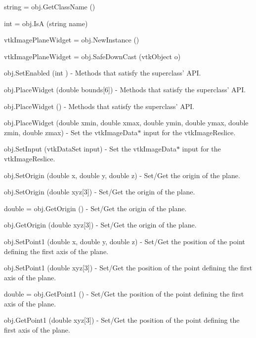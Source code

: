 \begin{DoxyItemize}
\item {\ttfamily string = obj.\-Get\-Class\-Name ()}  
\item {\ttfamily int = obj.\-Is\-A (string name)}  
\item {\ttfamily vtk\-Image\-Plane\-Widget = obj.\-New\-Instance ()}  
\item {\ttfamily vtk\-Image\-Plane\-Widget = obj.\-Safe\-Down\-Cast (vtk\-Object o)}  
\item {\ttfamily obj.\-Set\-Enabled (int )} -\/ Methods that satisfy the superclass' A\-P\-I.  
\item {\ttfamily obj.\-Place\-Widget (double bounds\mbox{[}6\mbox{]})} -\/ Methods that satisfy the superclass' A\-P\-I.  
\item {\ttfamily obj.\-Place\-Widget ()} -\/ Methods that satisfy the superclass' A\-P\-I.  
\item {\ttfamily obj.\-Place\-Widget (double xmin, double xmax, double ymin, double ymax, double zmin, double zmax)} -\/ Set the vtk\-Image\-Data$\ast$ input for the vtk\-Image\-Reslice.  
\item {\ttfamily obj.\-Set\-Input (vtk\-Data\-Set input)} -\/ Set the vtk\-Image\-Data$\ast$ input for the vtk\-Image\-Reslice.  
\item {\ttfamily obj.\-Set\-Origin (double x, double y, double z)} -\/ Set/\-Get the origin of the plane.  
\item {\ttfamily obj.\-Set\-Origin (double xyz\mbox{[}3\mbox{]})} -\/ Set/\-Get the origin of the plane.  
\item {\ttfamily double = obj.\-Get\-Origin ()} -\/ Set/\-Get the origin of the plane.  
\item {\ttfamily obj.\-Get\-Origin (double xyz\mbox{[}3\mbox{]})} -\/ Set/\-Get the origin of the plane.  
\item {\ttfamily obj.\-Set\-Point1 (double x, double y, double z)} -\/ Set/\-Get the position of the point defining the first axis of the plane.  
\item {\ttfamily obj.\-Set\-Point1 (double xyz\mbox{[}3\mbox{]})} -\/ Set/\-Get the position of the point defining the first axis of the plane.  
\item {\ttfamily double = obj.\-Get\-Point1 ()} -\/ Set/\-Get the position of the point defining the first axis of the plane.  
\item {\ttfamily obj.\-Get\-Point1 (double xyz\mbox{[}3\mbox{]})} -\/ Set/\-Get the position of the point defining the first axis of the plane.  

\end{DoxyItemize}
